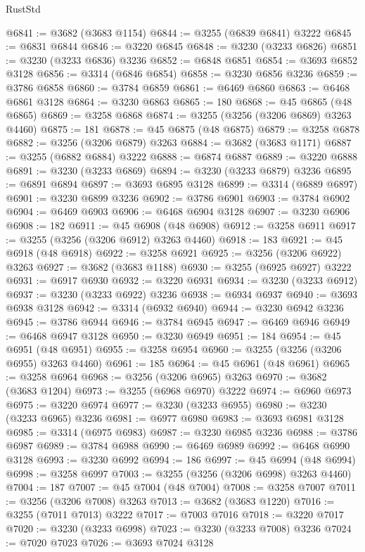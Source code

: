 \begin{lexlean}{RustStd}
\begin{coremodule}
@6841 := @3682 (@3683 @1154)
@6844 := @3255 (@6839 @6841) @3222
@6845 := @6831 @6844
@6846 := @3220 @6845
@6848 := @3230 (@3233 @6826)
@6851 := @3230 (@3233 @6836) @3236
@6852 := @6848 @6851
@6854 := @3693 @6852 @3128
@6856 := @3314 (@6846 @6854)
@6858 := @3230 @6856 @3236
@6859 := @3786 @6858
@6860 := @3784 @6859
@6861 := @6469 @6860
@6863 := @6468 @6861 @3128
@6864 := @3230 @6863
@6865 := 180
@6868 := @45 @6865 (@48 @6865)
@6869 := @3258 @6868
@6874 := @3255 (@3256 (@3206 @6869) @3263 @4460)
@6875 := 181
@6878 := @45 @6875 (@48 @6875)
@6879 := @3258 @6878
@6882 := @3256 (@3206 @6879) @3263
@6884 := @3682 (@3683 @1171)
@6887 := @3255 (@6882 @6884) @3222
@6888 := @6874 @6887
@6889 := @3220 @6888
@6891 := @3230 (@3233 @6869)
@6894 := @3230 (@3233 @6879) @3236
@6895 := @6891 @6894
@6897 := @3693 @6895 @3128
@6899 := @3314 (@6889 @6897)
@6901 := @3230 @6899 @3236
@6902 := @3786 @6901
@6903 := @3784 @6902
@6904 := @6469 @6903
@6906 := @6468 @6904 @3128
@6907 := @3230 @6906
@6908 := 182
@6911 := @45 @6908 (@48 @6908)
@6912 := @3258 @6911
@6917 := @3255 (@3256 (@3206 @6912) @3263 @4460)
@6918 := 183
@6921 := @45 @6918 (@48 @6918)
@6922 := @3258 @6921
@6925 := @3256 (@3206 @6922) @3263
@6927 := @3682 (@3683 @1188)
@6930 := @3255 (@6925 @6927) @3222
@6931 := @6917 @6930
@6932 := @3220 @6931
@6934 := @3230 (@3233 @6912)
@6937 := @3230 (@3233 @6922) @3236
@6938 := @6934 @6937
@6940 := @3693 @6938 @3128
@6942 := @3314 (@6932 @6940)
@6944 := @3230 @6942 @3236
@6945 := @3786 @6944
@6946 := @3784 @6945
@6947 := @6469 @6946
@6949 := @6468 @6947 @3128
@6950 := @3230 @6949
@6951 := 184
@6954 := @45 @6951 (@48 @6951)
@6955 := @3258 @6954
@6960 := @3255 (@3256 (@3206 @6955) @3263 @4460)
@6961 := 185
@6964 := @45 @6961 (@48 @6961)
@6965 := @3258 @6964
@6968 := @3256 (@3206 @6965) @3263
@6970 := @3682 (@3683 @1204)
@6973 := @3255 (@6968 @6970) @3222
@6974 := @6960 @6973
@6975 := @3220 @6974
@6977 := @3230 (@3233 @6955)
@6980 := @3230 (@3233 @6965) @3236
@6981 := @6977 @6980
@6983 := @3693 @6981 @3128
@6985 := @3314 (@6975 @6983)
@6987 := @3230 @6985 @3236
@6988 := @3786 @6987
@6989 := @3784 @6988
@6990 := @6469 @6989
@6992 := @6468 @6990 @3128
@6993 := @3230 @6992
@6994 := 186
@6997 := @45 @6994 (@48 @6994)
@6998 := @3258 @6997
@7003 := @3255 (@3256 (@3206 @6998) @3263 @4460)
@7004 := 187
@7007 := @45 @7004 (@48 @7004)
@7008 := @3258 @7007
@7011 := @3256 (@3206 @7008) @3263
@7013 := @3682 (@3683 @1220)
@7016 := @3255 (@7011 @7013) @3222
@7017 := @7003 @7016
@7018 := @3220 @7017
@7020 := @3230 (@3233 @6998)
@7023 := @3230 (@3233 @7008) @3236
@7024 := @7020 @7023
@7026 := @3693 @7024 @3128

\end{coremodule}
\end{lexlean}
